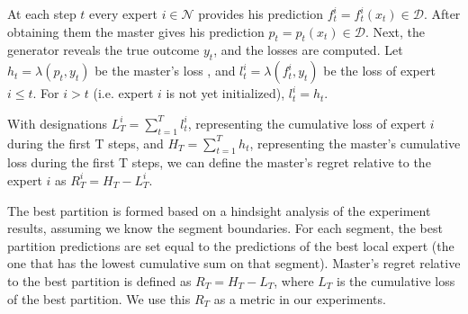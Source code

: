 \documentclass[12pt, twoside]{article}
\begin{document}
At each step $t$ every expert $i \in \mathcal{N}$ provides his prediction $f_t^i = f_t^i(x_t)  \in \mathcal{D}$. 
After obtaining them the master gives his prediction $p_t = p_t(x_t) \in \mathcal{D}$. 
Next, the generator reveals the true outcome $y_t$, and the losses are computed.
Let $h_t = \lambda(p_t, y_t)$ be the master's loss , and $l_t^i = \lambda(f_t^i, y_t)$ be the loss of expert $i \le t$. For $i > t$ (i.e. expert $i$ is not yet initialized), $l_t^i = h_t$.

With designations $L_T^i = \sum_{t = 1}^T l_t^i$, representing the cumulative loss of expert $i$ during the first T steps, and $H_T = \sum_{t = 1}^T h_t$, 
representing the master's cumulative loss during the first T steps, we can define the master's regret relative to the expert $i$ as $R^i_T = H_T - L^i_T$. 

The best partition is formed based on a hindsight analysis of the experiment results, assuming we know the segment boundaries. For each segment, the best partition predictions are set equal to the predictions of the best local expert (the one that has the lowest cumulative sum on that segment). Master's regret relative to the best partition is defined as $R_T= H_T - L_T$, where $L_T$ is the cumulative loss of the best partition. We use this $R_T$ as a metric in our experiments.

 
\vspace{5mm}
\end{document}

